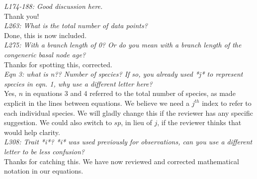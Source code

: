 \documentclass[11pt]{article}
\begin{document}
\emph{L174-188: Good discussion here.}\\
Thank you!\\ %

\emph{L263: What is the total number of data points?}\\
Done, this is now included.\\ 

\emph{L275: With a branch length of 0? Or do you mean with a branch length of the congeneric basal node age?}\\
Thanks for spotting this, corrected.\\

\emph{Eqn 3: what is n?? Number of species? If so, you already used *j* to represent species in eqn. 1, why use a different letter here?}\\
Yes, $n$ in equations 3 and 4 referred to the total number of species, as made explicit in the lines between equations. We believe we need a $j^{th}$ index to refer to each individual species. We will gladly change this if the reviewer has any specific suggestion. We could also switch to $sp$, in lieu of $j$, if the reviewer thinks that would help clarity.\\


\emph{L308: Trait *i*? *i* was used previously for observations, can you use a different letter to be less confusion?}\\
Thanks for catching this. We have now reviewed and corrected mathematical notation in our equations.\\



\end{document}
